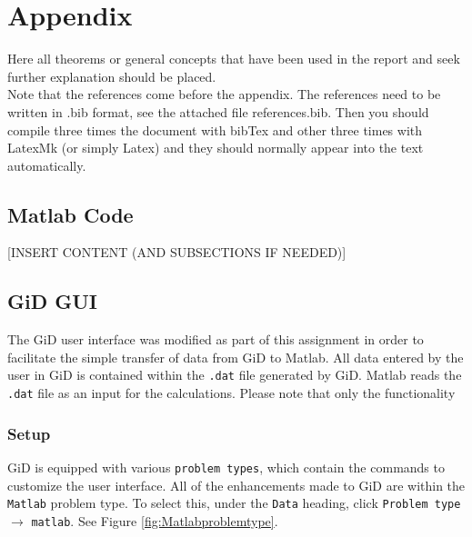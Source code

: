 \section{Appendix}

Here all theorems or general concepts that have been used in the report and seek further explanation should be placed.\\[6pt]
Note that the references come before the appendix. The references need to be written in .bib format, see the attached file references.bib. Then you should compile three times the document with bibTex and other three times with LatexMk (or simply Latex) and they should normally appear into the text automatically.\\[6pt]
\subsection{Matlab Code} \label{section:appendix_matlab}
[INSERT CONTENT (AND SUBSECTIONS IF NEEDED)]

\subsection{GiD GUI} \label{section:appendix_GiD}
The GiD user interface was modified as part of this assignment in order to facilitate the simple transfer of data from GiD to Matlab. All data entered by the user in GiD is contained within the \texttt{.dat} file generated by GiD. Matlab reads the \texttt{.dat} file as an input for the calculations. Please note that only the functionality

\subsubsection{Setup}
GiD is equipped with various \texttt{problem types}, which contain the commands to customize the user interface. All of the enhancements made to GiD are within the \texttt{Matlab} problem type. To select this, under the \texttt{Data} heading, click \texttt{Problem type} $\rightarrow$ \texttt{matlab}. See Figure \ref{fig:Matlabproblemtype}.

